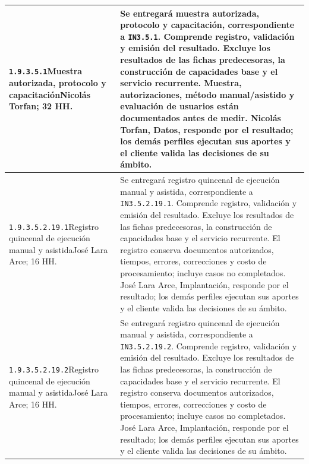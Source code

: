 \begin{longtable}{L{52mm}L{91mm}}
\texttt{1.\allowbreak{}9.\allowbreak{}3.\allowbreak{}5.\allowbreak{}1}\newline Muestra autorizada, protocolo y capacitación\newline Nicolás Torfan; 32 HH. & Se entregará muestra autorizada, protocolo y capacitación, correspondiente a \texttt{IN3.5.1}. Comprende registro, validación y emisión del resultado. Excluye los resultados de las fichas predecesoras, la construcción de capacidades base y el servicio recurrente.  Muestra, autorizaciones, método manual/asistido y evaluación de usuarios están documentados antes de medir. Nicolás Torfan, Datos, responde por el resultado; los demás perfiles ejecutan sus aportes y el cliente valida las decisiones de su ámbito.\\\hline
\texttt{1.\allowbreak{}9.\allowbreak{}3.\allowbreak{}5.\allowbreak{}2.\allowbreak{}19.\allowbreak{}1}\newline Registro quincenal de ejecución manual y asistida\newline José Lara Arce; 16 HH. & Se entregará registro quincenal de ejecución manual y asistida, correspondiente a \texttt{IN3.5.2.19.1}. Comprende registro, validación y emisión del resultado. Excluye los resultados de las fichas predecesoras, la construcción de capacidades base y el servicio recurrente.  El registro conserva documentos autorizados, tiempos, errores, correcciones y costo de procesamiento; incluye casos no completados. José Lara Arce, Implantación, responde por el resultado; los demás perfiles ejecutan sus aportes y el cliente valida las decisiones de su ámbito.\\\hline
\texttt{1.\allowbreak{}9.\allowbreak{}3.\allowbreak{}5.\allowbreak{}2.\allowbreak{}19.\allowbreak{}2}\newline Registro quincenal de ejecución manual y asistida\newline José Lara Arce; 16 HH. & Se entregará registro quincenal de ejecución manual y asistida, correspondiente a \texttt{IN3.5.2.19.2}. Comprende registro, validación y emisión del resultado. Excluye los resultados de las fichas predecesoras, la construcción de capacidades base y el servicio recurrente.  El registro conserva documentos autorizados, tiempos, errores, correcciones y costo de procesamiento; incluye casos no completados. José Lara Arce, Implantación, responde por el resultado; los demás perfiles ejecutan sus aportes y el cliente valida las decisiones de su ámbito.\\\hline

\end{longtable}
